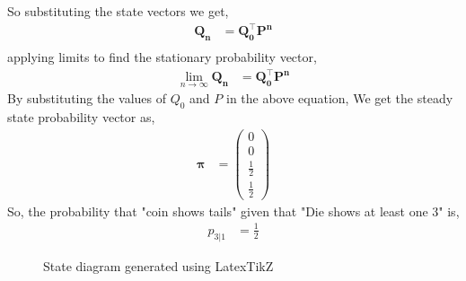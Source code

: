 \documentclass[journal,12pt,two column]{IEEEtran}
\newcommand{\myvec}[1]{\ensuremath{\begin{pmatrix}#1\end{pmatrix}}}
\let\vec\mathbf
\begin{document}
So substituting the state vectors we get,
\begin{align}
    \vec{Q_{n}}&=\vec{Q_0^{\top} P^{n}}\\
\end{align}
applying limits to find the stationary probability vector,
\begin{align}
     \lim_{n \to \infty} \vec{Q_{n}}&=\vec{Q_0^{\top} P^{n}}
\end{align} \label{eq:steady}
By substituting the values of $Q_0$ and $P$ in the above equation, We get the steady state probability vector as,
\begin{align}
    \vec{\pi}&=\myvec{0\\0\\\frac{1}{2}\\\frac{1}{2}}
\end{align}
So, the probability that "coin shows tails" given that "Die shows at least one 3" is,
\begin{align}
    p_{3|1} &= \frac{1}{2}
\end{align}
\begin{figure}[ht!]
    \centering
    \resizebox{.9\linewidth}{!}{}
    \caption{State diagram generated using LatexTikZ}
    \label{fig:Statediagramdiecoin}
\end{figure}
\end{document}
